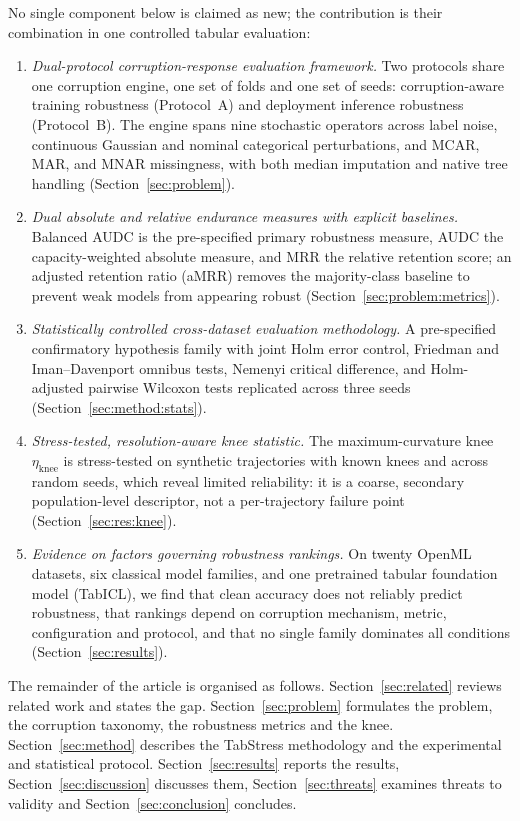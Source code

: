 \documentclass[pdflatex,sn-mathphys]{sn-jnl}
\theoremstyle{thmstyleone}
\theoremstyle{thmstyletwo}
\theoremstyle{thmstylethree}
\newcommand{\etaknee}{\eta_{\mathrm{knee}}}
\begin{document}
No single component below is claimed as new; the contribution is their combination in one controlled tabular evaluation:
\begin{enumerate}
\item \emph{Dual-protocol corruption-response evaluation framework.} Two protocols share one corruption engine, one set of folds and one set of seeds: corruption-aware training robustness (Protocol~A) and deployment inference robustness (Protocol~B). The engine spans nine stochastic operators across label noise, continuous Gaussian and nominal categorical perturbations, and MCAR, MAR, and MNAR missingness, with both median imputation and native tree handling (Section~\ref{sec:problem}).
\item \emph{Dual absolute and relative endurance measures with explicit baselines.} Balanced AUDC is the pre-specified primary robustness measure, AUDC the capacity-weighted absolute measure, and MRR the relative retention score; an adjusted retention ratio (aMRR) removes the majority-class baseline to prevent weak models from appearing robust (Section~\ref{sec:problem:metrics}).
\item \emph{Statistically controlled cross-dataset evaluation methodology.} A pre-specified confirmatory hypothesis family with joint Holm error control, Friedman and Iman--Davenport omnibus tests, Nemenyi critical difference, and Holm-adjusted pairwise Wilcoxon tests replicated across three seeds (Section~\ref{sec:method:stats}).
\item \emph{Stress-tested, resolution-aware knee statistic.} The maximum-curvature knee $\etaknee$ is stress-tested on synthetic trajectories with known knees and across random seeds, which reveal limited reliability: it is a coarse, secondary population-level descriptor, not a per-trajectory failure point (Section~\ref{sec:res:knee}).
\item \emph{Evidence on factors governing robustness rankings.} On twenty OpenML datasets, six classical model families, and one pretrained tabular foundation model (TabICL), we find that clean accuracy does not reliably predict robustness, that rankings depend on corruption mechanism, metric, configuration and protocol, and that no single family dominates all conditions (Section~\ref{sec:results}).
\end{enumerate}

The remainder of the article is organised as follows. Section~\ref{sec:related} reviews related work and states the gap. Section~\ref{sec:problem} formulates the problem, the corruption taxonomy, the robustness metrics and the knee. Section~\ref{sec:method} describes the TabStress methodology and the experimental and statistical protocol. Section~\ref{sec:results} reports the results, Section~\ref{sec:discussion} discusses them, Section~\ref{sec:threats} examines threats to validity and Section~\ref{sec:conclusion} concludes.
\end{document}
